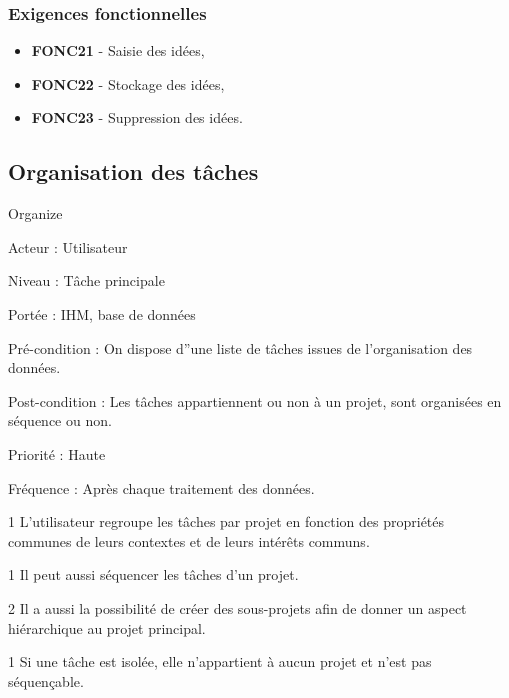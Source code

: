 \subsubsection{Exigences fonctionnelles}

\begin{itemize}	\renewcommand{\labelitemi}{}
\item \textbf{FONC21} - Saisie des idées,
\item \textbf{FONC22} - Stockage des idées,
\item \textbf{FONC23} - Suppression des idées.
\end{itemize}


\subsection{Organisation des tâches}
	\begin{usecase}{Organize} 
		\begin{information}
			\item[Acteur :] Utilisateur
			\item[Niveau :] Tâche principale
			\item[Portée :] IHM, base de données
			\item[Pré-condition :] On dispose d''une liste de tâches issues de l'organisation des données.
			\item[Post-condition :] Les tâches appartiennent ou non à un projet, sont organisées en séquence ou non.
			\item[Priorité :] Haute
			\item[Fréquence :] Après chaque traitement des données.
		\end{information}
		\begin{scenario}
			\item[1] L'utilisateur regroupe les tâches par projet en fonction des propriétés communes de leurs contextes et de leurs intérêts communs.
			\item[1] Il peut aussi séquencer les tâches d'un projet. 
			\item[2] Il a aussi la possibilité de créer des sous-projets afin de donner un aspect hiérarchique au projet principal.
		\end{scenario}
		\begin{extension}
			\item[1]Si une tâche est isolée, elle n'appartient à aucun projet et n'est pas séquençable.
		\end{extension}
	\end{usecase}
		

